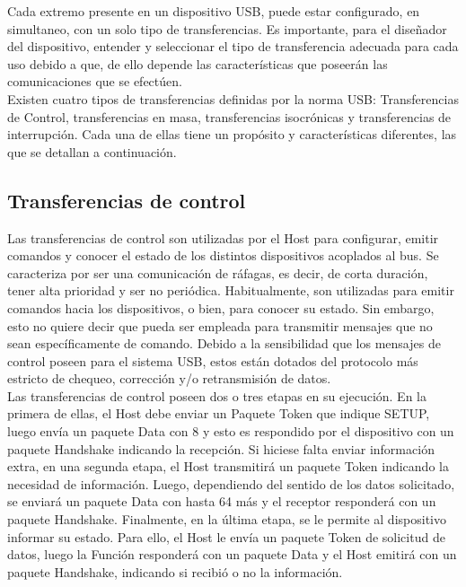 Cada extremo presente en un dispositivo USB, puede estar configurado, en simultaneo, con un solo tipo de transferencias. Es importante, para el diseñador del dispositivo, entender y seleccionar el tipo de transferencia adecuada para cada uso debido a que, de ello depende las características que poseerán las comunicaciones que se efectúen.\\

Existen cuatro tipos de transferencias definidas por la norma USB: Transferencias de Control, transferencias en masa, transferencias isocrónicas y transferencias de interrupción. Cada una de ellas tiene un propósito y características diferentes, las que se detallan a continuación.

\subsection{Transferencias de control}
	
	Las transferencias de control son utilizadas por el Host para configurar, emitir comandos y conocer el estado de los distintos dispositivos acoplados al bus. Se caracteriza por ser una comunicación de ráfagas, es decir, de corta duración, tener alta prioridad y ser no periódica. Habitualmente, son utilizadas para emitir comandos hacia los dispositivos, o bien, para conocer su estado. Sin embargo, esto no quiere decir que pueda ser empleada para transmitir mensajes que no sean específicamente de comando. Debido a la sensibilidad que los mensajes de control poseen para el sistema USB, estos están dotados del protocolo más estricto de chequeo, corrección y/o retransmisión de datos.\\
	
	Las transferencias de control poseen dos o tres etapas en su ejecución. En la primera de ellas, el Host debe enviar un Paquete Token que indique SETUP, luego envía un paquete Data con \SI{8}{\byte} y esto es respondido por el dispositivo con un paquete Handshake indicando la recepción. Si hiciese falta enviar información extra, en una segunda etapa, el Host transmitirá un paquete Token indicando la necesidad de información. Luego, dependiendo del sentido de los datos solicitado, se enviará un paquete Data con hasta \SI{64}{\byte} más y el receptor responderá con un paquete Handshake. Finalmente, en la última etapa, se le permite al dispositivo informar su estado. Para ello, el Host le envía un paquete Token de solicitud de datos, luego la Función responderá con un paquete Data y el Host emitirá con un paquete Handshake, indicando si recibió o no la información.
	

